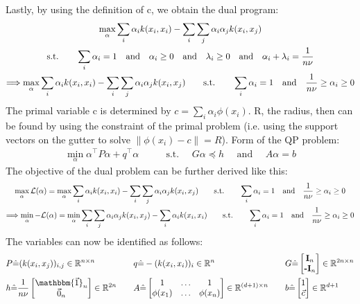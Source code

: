 \documentclass[a4paper]{article}
\newcommand{\norm}[1]{\left\lVert#1\right\rVert}
\newcommand{\1}{\mathds{1}}
\newcommand{\lag}{\mathcal{L}}
\begin{document}
Lastly, by using the definition of c, we obtain the dual program:
\begin{gather*}
	\max_\alpha \sum_i \alpha_i k(x_i,x_i) - \sum_i\sum_j\alpha_i\alpha_j k(x_i,x_j)
	\\
	\text{s.t.} \quad\quad
	\sum_i\alpha_i = 1
	\quad\text{and} \quad
	\alpha_i \geq 0
	\quad\text{and} \quad
	\lambda_i \geq 0
	\quad\text{and} \quad
	\alpha_i + \lambda_i = {1\over n\nu}
	\\
	\Longrightarrow
	\max_\alpha \sum_i \alpha_i k(x_i,x_i) - \sum_i\sum_j\alpha_i\alpha_j k(x_i,x_j)
	\quad\quad\text{s.t.} \quad\quad
	\sum_i\alpha_i = 1
	\quad\text{and} \quad
	{1\over n\nu} \geq \alpha_i \geq 0
\end{gather*}
The primal variable c is determined by $c=\sum_i\alpha_i\phi(x_i)$.
R, the radius, then can be found by using the constraint of the primal problem 
(i.e. using the support vectors on the gutter to solve $\norm{\phi(x_i)-c} = R$).
\newpage
{}
Form of the QP problem:
\begin{align*}
	\min_\alpha \alpha^\top P\alpha + q^\top \alpha \quad\quad & \text{s.t. }\quad G\alpha\preceq h
	 \quad \text{ and }\quad A\alpha=b  
\end{align*}
The objective of the dual problem can be further derived like this:
\begin{gather*}
	\max_\alpha\lag(\alpha )
	=
	\max_\alpha \sum_i \alpha_i k(x_i,x_i) - \sum_i\sum_j\alpha_i\alpha_j k(x_i,x_j)
	\quad\quad\text{s.t.} \quad\quad
	\sum_i\alpha_i = 1
	\quad\text{and} \quad
	{1\over n\nu} \geq \alpha_i \geq 0
	\\
	\Longrightarrow
	\min_\alpha -\lag(\alpha )
	=
	\min_\alpha \sum_i\sum_j\alpha_i\alpha_j k(x_i,x_j) - \sum_i \alpha_i k(x_i,x_i) 
	\quad\quad\text{s.t.} \quad\quad
	\sum_i\alpha_i = 1
	\quad\text{and} \quad
	{1\over n\nu} \geq \alpha_i \geq 0	
\end{gather*}
The variables can now be identified as follows:
\begin{align*}
	& P\hat{=}(k(x_i,x_j))_{i,j}\in\mathbb{R}^{n\times n} & \quad & 
	q\hat{=}-(k(x_i,x_i))_{i}\in\mathbb{R}^{n} & \quad & 
	G\hat{=} 
	\begin{bmatrix}
		\textbf{I}_n \\ 
		\textbf{-I}_n 
	\end{bmatrix}\in\mathbb{R}^{2n\times n}
	\\
	&h\hat{=}{1\over n\nu}
	\begin{bmatrix}
		\mathbbm{\vec{1}}_n \\ 
		\vec{0}_n 
	\end{bmatrix}\in\mathbb{R}^{2n}
	& \quad & A\hat{=}
	\begin{bmatrix}
		1 & \ldots & 1 \\ 
		\phi(x_1) & \ldots & \phi(x_n)  
	\end{bmatrix}\in\mathbb{R}^{(d+1)\times n}
	& \quad & b\hat{=}
	\begin{bmatrix}
		1 \\ 
		\vec{c} 
	\end{bmatrix}\in\mathbb{R}^{d+1}
\end{align*} 
\end{document}
